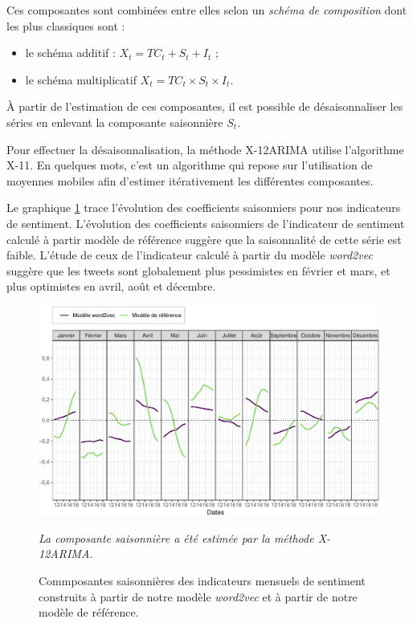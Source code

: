\documentclass[11pt,french,french]{article}
\begin{document}
Ces composantes sont combinées entre elles selon un \emph{schéma de composition} dont les plus classiques sont :

\begin{itemize}
\item
  le schéma additif : \(X_t=TC_t+S_t+I_t\) ;
\item
  le schéma multiplicatif \(X_t=TC_t\times S_t\times I_t\).
\end{itemize}

À partir de l'estimation de ces composantes, il est possible de désaisonnaliser les séries en enlevant la composante saisonnière \(S_t\).

Pour effectuer la désaisonnalisation, la méthode X-12ARIMA utilise l'algorithme X-11.
En quelques mots, c'est un algorithme qui repose sur l'utilisation de moyennes mobiles afin d'estimer itérativement les différentes composantes.

Le graphique \ref{fig:coefcvscjo} trace l'évolution des coefficients saisonniers pour nos indicateurs de sentiment.
L'évolution des coefficients saisonniers de l'indicateur de sentiment calculé à partir modèle de référence suggère que la saisonnalité de cette série est faible.
L'étude de ceux de l'indicateur calculé à partir du modèle \emph{word2vec} suggère que les tweets sont globalement plus pessimistes en février et mars, et plus optimistes en avril, août et décembre.

\begin{figure}[htp]
{\centering\includegraphics[width = \textwidth]{img/rmd-graphCoefCVS-1}}
\captionsetup{margin=0cm,format=hang,justification=justified}
\caption{Commposantes saisonnières des indicateurs mensuels de sentiment construits à partir de notre modèle \emph{word2vec} et à partir de notre modèle de référence.}\label{fig:coefcvscjo}
\footnotesize

\emph{La composante saisonnière a été estimée par la méthode X-12ARIMA.}
\end{figure}
\end{document}
